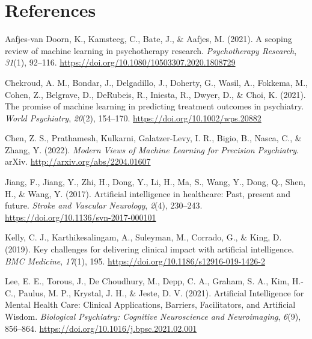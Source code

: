 \documentclass[
  man]{apa7}
\newlength{\cslhangindent}
\newlength{\cslentryspacingunit} %
\newenvironment{CSLReferences}[2] %
 {%
  \setlength{\parindent}{0pt}
  \ifodd #1
  \let\oldpar\par
  \def\par{\hangindent=\cslhangindent\oldpar}
  \fi
  \setlength{\parskip}{#2\cslentryspacingunit}
 }%
 {}
\begin{document}
\newpage

\hypertarget{references}{%
\section{References}\label{references}}

\hypertarget{refs}{}
\begin{CSLReferences}{1}{0}
\leavevmode{}%
Aafjes-van Doorn, K., Kamsteeg, C., Bate, J., \& Aafjes, M. (2021). A scoping review of machine learning in psychotherapy research. \emph{Psychotherapy Research}, \emph{31}(1), 92--116. \url{https://doi.org/10.1080/10503307.2020.1808729}

\leavevmode{}%
Chekroud, A. M., Bondar, J., Delgadillo, J., Doherty, G., Wasil, A., Fokkema, M., Cohen, Z., Belgrave, D., DeRubeis, R., Iniesta, R., Dwyer, D., \& Choi, K. (2021). The promise of machine learning in predicting treatment outcomes in psychiatry. \emph{World Psychiatry}, \emph{20}(2), 154--170. \url{https://doi.org/10.1002/wps.20882}

\leavevmode{}%
Chen, Z. S., Prathamesh, Kulkarni, Galatzer-Levy, I. R., Bigio, B., Nasca, C., \& Zhang, Y. (2022). \emph{Modern {Views} of {Machine} {Learning} for {Precision} {Psychiatry}}. arXiv. \url{http://arxiv.org/abs/2204.01607}

\leavevmode{}%
Jiang, F., Jiang, Y., Zhi, H., Dong, Y., Li, H., Ma, S., Wang, Y., Dong, Q., Shen, H., \& Wang, Y. (2017). Artificial intelligence in healthcare: Past, present and future. \emph{Stroke and Vascular Neurology}, \emph{2}(4), 230--243. \url{https://doi.org/10.1136/svn-2017-000101}

\leavevmode{}%
Kelly, C. J., Karthikesalingam, A., Suleyman, M., Corrado, G., \& King, D. (2019). Key challenges for delivering clinical impact with artificial intelligence. \emph{BMC Medicine}, \emph{17}(1), 195. \url{https://doi.org/10.1186/s12916-019-1426-2}

\leavevmode{}%
Lee, E. E., Torous, J., De Choudhury, M., Depp, C. A., Graham, S. A., Kim, H.-C., Paulus, M. P., Krystal, J. H., \& Jeste, D. V. (2021). Artificial {Intelligence} for {Mental} {Health} {Care}: {Clinical} {Applications}, {Barriers}, {Facilitators}, and {Artificial} {Wisdom}. \emph{Biological Psychiatry: Cognitive Neuroscience and Neuroimaging}, \emph{6}(9), 856--864. \url{https://doi.org/10.1016/j.bpsc.2021.02.001}


\end{CSLReferences}
\end{document}
